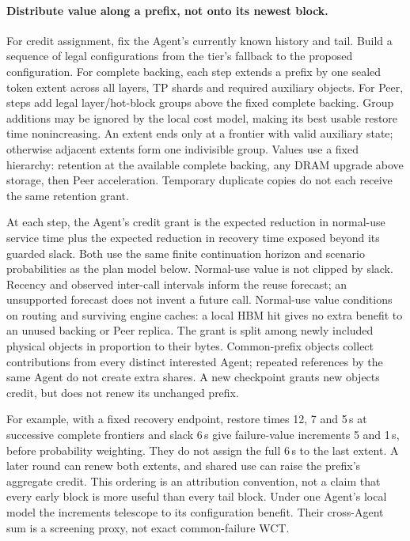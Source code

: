 \paragraph{Distribute value along a prefix, not onto its newest block.}
For credit assignment, fix the Agent's currently known history and tail.
Build a sequence of legal configurations from the tier's fallback to the
proposed configuration. For complete backing, each step extends a prefix
by one sealed token extent across all layers, TP shards and required
auxiliary objects. For Peer, steps add legal layer/hot-block groups above
the fixed complete backing. Group additions may be ignored by the local
cost model, making its best usable restore time nonincreasing.
An extent ends only at a frontier with valid auxiliary state; otherwise
adjacent extents form one indivisible group. Values use a fixed hierarchy:
retention at the available complete backing, any DRAM upgrade above
storage, then Peer acceleration. Temporary duplicate copies do not each
receive the same retention grant.

At each step, the Agent's credit grant is the expected reduction in
normal-use service time plus the expected reduction in recovery time
exposed beyond its guarded slack. Both use the same finite continuation
horizon and scenario probabilities as the plan model below. Normal-use
value is not clipped by slack. Recency and observed inter-call intervals
inform the reuse forecast; an unsupported forecast does not invent a
future call. Normal-use value conditions on routing and surviving engine
caches: a local HBM hit gives no extra benefit to an unused backing or
Peer replica. The grant is split among newly included physical objects
in proportion to their bytes. Common-prefix objects collect contributions
from every distinct interested Agent; repeated references by the same
Agent do not create extra shares. A new checkpoint grants new objects
credit, but does not renew its unchanged prefix.

For example, with a fixed recovery endpoint, restore times 12, 7 and
5\,s at successive complete frontiers and slack 6\,s give failure-value
increments 5 and 1\,s, before probability weighting. They do not assign
the full 6\,s to the last extent. A later round can renew both extents,
and shared use can raise the prefix's aggregate credit. This ordering
is an attribution convention, not a claim that every early block is
more useful than every tail block. Under one Agent's local model the
increments telescope to its configuration benefit. Their cross-Agent
sum is a screening proxy, not exact common-failure WCT.

